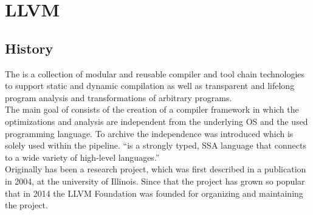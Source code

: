 \chapter{LLVM}
\section{History}
The \llvm is a collection of modular and reusable compiler and tool chain technologies to support static and dynamic compilation as well as transparent and lifelong program analysis and transformations of arbitrary programs. \cite{LLVMWebsite, LLVMResearchBeginning}\\
The main goal of \llvm consists of the creation of a compiler framework in which the optimizations and analysis are independent from the underlying OS and the used programming language.
To archive the independence \llvmir was introduced which is solely used within the pipeline.
\enquote{\llvmir is a strongly typed, \ac{SSA} language that connects to a wide variety of high-level languages.} \cite{PolyhedralEmpiricalStudy}\\
Originally \llvm has been a research project, which was first described in a publication in 2004, at the university of Illinois.
Since that the project has grown so popular that in 2014 the LLVM Foundation was founded for organizing and maintaining the project. \cite{LLVMFoundation}\\

